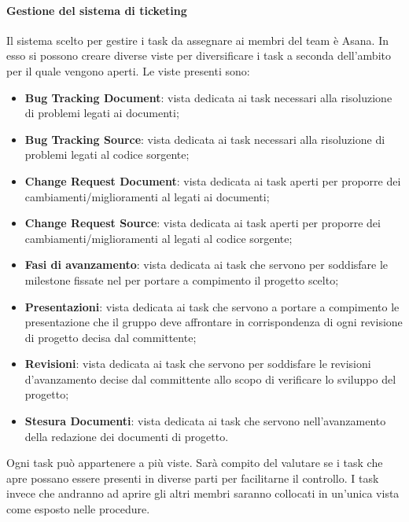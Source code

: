 			\paragraph{Gestione del sistema di ticketing} %
			\label{par:gestione_del_sistema_di_ticketing}
			Il sistema scelto per gestire i task da assegnare ai membri del team è Asana. \newline
			In esso si possono creare diverse viste per diversificare i task a seconda dell'ambito per il quale vengono aperti. Le viste presenti sono:
				\begin{itemize}
					\item \textbf{Bug Tracking Document}: vista dedicata ai task necessari alla risoluzione di problemi legati ai documenti;
					\item \textbf{Bug Tracking Source}: vista dedicata ai task necessari alla risoluzione di problemi legati al codice sorgente;
					\item \textbf{Change Request Document}: vista dedicata ai task aperti per proporre dei cambiamenti/miglioramenti al \roleProjectManager{} legati ai documenti;
					\item \textbf{Change Request Source}: vista dedicata ai task aperti per proporre dei cambiamenti/miglioramenti al \roleProjectManager{} legati al codice sorgente;
					\item \textbf{Fasi di avanzamento}: vista dedicata ai task che servono per soddisfare le milestone fissate nel \docNameVersionPdP per portare a compimento il progetto scelto;
					\item \textbf{Presentazioni}: vista dedicata ai task che servono a portare a compimento le presentazione che il gruppo \groupName{} deve affrontare in corrispondenza di ogni revisione di progetto decisa dal committente;
					\item \textbf{Revisioni}: vista dedicata ai task che servono per soddisfare le revisioni d'avanzamento decise dal committente allo scopo di verificare lo sviluppo del progetto;
					\item \textbf{Stesura Documenti}: vista dedicata ai task che servono nell'avanzamento della redazione dei documenti di progetto.
				\end{itemize}
			\noindent
			Ogni task può appartenere a più viste. Sarà compito del \roleProjectManager{} valutare se i task che apre possano essere presenti in diverse parti per facilitarne il controllo. I task invece che andranno ad aprire gli altri membri saranno collocati in un'unica vista come esposto nelle procedure.
			
